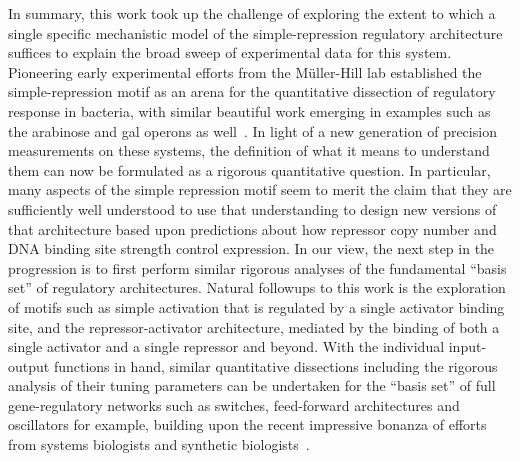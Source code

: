 In summary, this work took up the challenge of exploring the extent to which a
single specific mechanistic model of the simple-repression regulatory
architecture suffices to explain the broad sweep of experimental data for this
system. Pioneering early experimental efforts from the M\"{u}ller-Hill lab
established the simple-repression motif as an arena for the quantitative
dissection of regulatory response in bacteria, with similar beautiful work
emerging in examples such as the arabinose and gal operons as
well~\cite{Dunn1984b, Oehler1990, Weickert1993, Oehler1994, Schleif2000,
Semsey2002, SwintKruse2009}. In light of a new generation of precision
measurements on these systems, the definition of what it means to understand
them can now be formulated as a rigorous quantitative question. In particular,
many aspects of the simple repression motif seem to merit the claim that they
are sufficiently well understood to use that understanding to design new
versions of that architecture based upon predictions about how repressor copy
number and DNA binding site strength control expression. In our view, the next
step in the progression is to first perform similar rigorous analyses of the
fundamental ``basis set'' of regulatory architectures. Natural followups to this
work is the exploration of motifs such as simple activation that is
regulated by a single activator binding site, and the repressor-activator
architecture, mediated by the binding of both a single activator and a single
repressor and beyond. With the individual input-output functions in hand,
similar quantitative dissections including the rigorous analysis of their tuning
parameters can be undertaken for the ``basis set'' of full gene-regulatory
networks such as switches, feed-forward architectures and oscillators for
example, building upon the recent impressive bonanza of efforts from systems
biologists and synthetic biologists~\cite{Milo2002, Alon2007}.